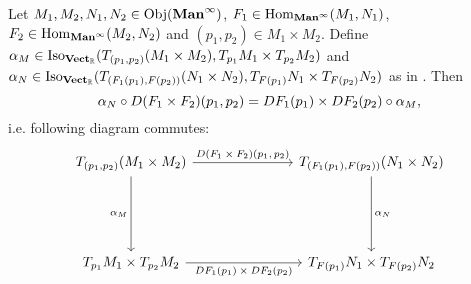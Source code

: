 \documentclass{book}
\begin{document}
	\begin{ex} 
		Let $M_1, M_2, N_1, N_2 \in \operatorname{Obj}(\operatorname*{\text{\textbf{Man}}^{\infty}})$, $F_1 \in \operatorname{Hom}_{\operatorname*{\text{\textbf{Man}}^{\infty}}}(M_1, N_1)$, $F_2 \in \operatorname{Hom}_{\operatorname*{\text{\textbf{Man}}^{\infty}}}(M_2, N_2)$ and $(p_1, p_2) \in M_1 \times M_2$. Define $\alpha_M \in \operatorname{Iso}_{\operatorname*{\text{\textbf{Vect}}_{\mathbb{R}}}}(T_{(p_1, p_2)}(M_1 \times M_2), T_{p_1}M_1 \times  T_{p_2}M_2)$ and $\alpha_N \in \operatorname{Iso}_{\operatorname*{\text{\textbf{Vect}}_{\mathbb{R}}}}(T_{(F_1(p_1), F(p_2))}(N_1 \times N_2), T_{F(p_1)}N_1 \times  T_{F(p_2)}N_2)$ as in . Then 
		$$\alpha_N \circ D(F_1 \times F_2)(p_1, p_2) = DF_1(p_1) \times DF_2(p_2) \circ \alpha_M,$$ i.e. following diagram commutes: 
		\[ 
		\begin{tikzcd}
			\text{$T_{(p_1, p_2)}(M_1 \times M_2)$} \arrow[ddd, "\al_M"'] \arrow[rrr, "\text{$D(F_1 \times F_2)(p_1, p_2)$}"] &&&  \text{$T_{(F_1(p_1), F(p_2))}(N_1 \times N_2)$} \arrow[ddd, "\al_N"] \\
			& \\
			& \\
			\text{$T_{p_1}M_1 \times T_{p_2}M_2$} \arrow[rrr, "\text{$DF_1(p_1) \times DF_2(p_2)$}"'] &&&  \text{$T_{F(p_1)}N_1 \times T_{F(p_2)}N_2$}
		\end{tikzcd}
		\] 
	\end{ex}
\end{document}
